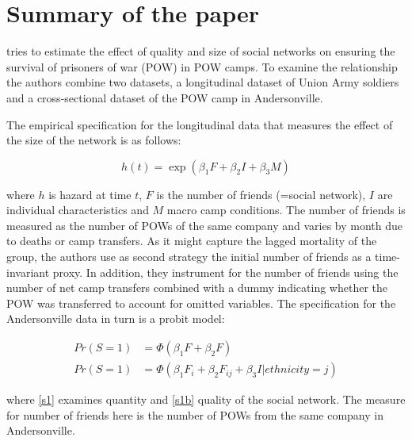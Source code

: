 \documentclass[draft.tex]{subfiles}
\begin{document}
\section{Summary of the paper}
\textcite{costa2007surviving} tries to estimate the effect of quality and size of social networks on ensuring the survival of prisoners of war (POW) in POW camps. To examine the relationship the authors combine two datasets, a longitudinal dataset of Union Army soldiers and a cross-sectional dataset of the POW camp in Andersonville. 

The empirical specification for the longitudinal data that measures the effect of the size of the network is as follows:

\begin{equation} \label{eq:ht}
h(t) = \exp ( \beta_1 F + \beta_2 I + \beta_3 M )
\end{equation}

where $h$ is hazard at time $t$, $F$ is the number of friends (=social network), $I$ are individual characteristics and $M$ macro camp conditions. The number of friends is measured as the number of POWs of the same company and varies by month due to deaths or camp transfers. As it might capture the lagged mortality of the group, the authors use as second strategy the initial number of friends as a time-invariant proxy. In addition, they instrument for the number of friends using the number of net camp transfers combined with a dummy indicating whether the POW was transferred to account for omitted variables. 
The specification for the Andersonville data in turn is a probit model:

\begin{align}
\label{s1} Pr(S = 1) &= \Phi (\beta_1 F + \beta_2 F)\\
\label{s1b} Pr(S = 1) &= \Phi (\beta_1 F_i + \beta_2 F_{ij} + \beta_3 I | ethnicity = j)
\end{align}

where \autoref{s1} examines quantity and \autoref{s1b} quality of the social network. The measure for number of friends here is the number of POWs from the same company in Andersonville.
\end{document}
